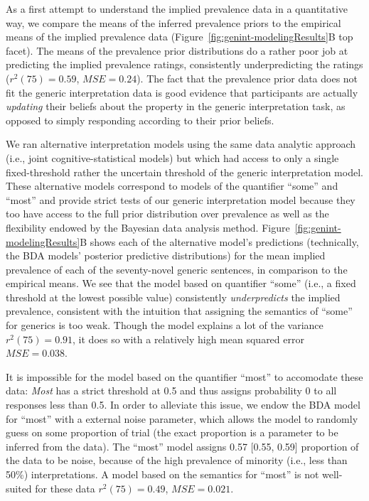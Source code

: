 \documentclass[floatsintext,doc]{apa6}
\theoremstyle{definition}
\theoremstyle{definition}
\theoremstyle{definition}
\theoremstyle{remark}
\begin{document}

As a first attempt to understand the implied prevalence data in a
quantitative way, we compare the means of the inferred prevalence priors
to the empirical means of the implied prevalence data
(Figure~\ref{fig:genint-modelingResults}B top facet). The means of the
prevalence prior distributions do a rather poor job at predicting the
implied prevalence ratings, consistently underpredicting the ratings
(\(r^2(75) = 0.59\), \(MSE = 0.24\)). The fact that the prevalence prior
data does not fit the generic interpretation data is good evidence that
participants are actually \emph{updating} their beliefs about the
property in the generic interpretation task, as opposed to simply
responding according to their prior beliefs.

We ran alternative interpretation models using the same data analytic
approach (i.e., joint cognitive-statistical models) but which had access
to only a single fixed-threshold rather the uncertain threshold of the
generic interpretation model.
 These alternative models correspond to
models of the quantifier \enquote{some} and \enquote{most} and provide
strict tests of our generic interpretation model because they too have
access to the full prior distribution over prevalence as well as the
flexibility endowed by the Bayesian data analysis method.
Figure~\ref{fig:genint-modelingResults}B shows each of the alternative
model's predictions (technically, the BDA models' posterior predictive
distributions) for the mean implied prevalence of each of the
seventy-novel generic sentences, in comparison to the empirical means.
We see that the model based on quantifier \enquote{some} (i.e., a fixed
threshold at the lowest possible value) consistently
\emph{underpredicts} the implied prevalence, consistent with the
intuition that assigning the semantics of \enquote{some} for generics is
too weak. Though the model explains a lot of the variance
\(r^2(75) = 0.91\), it does so with a relatively high mean squared error
\(MSE = 0.038\).

It is impossible for the model based on the quantifier \enquote{most} to
accomodate these data: \emph{Most} has a strict threshold at 0.5 and
thus assigns probability 0 to all responses less than 0.5.  In order to
alleviate this issue, we endow the BDA model for \enquote{most} with a
external noise parameter, which allows the model to randomly guess on
some proportion of trial (the exact proportion is a parameter to be
inferred from the data). The \enquote{most} model assigns 0.57 {[}0.55,
0.59{]} proportion of the data to be noise, because of the high
prevalence of minority (i.e., less than 50\%) interpretations. A model
based on the semantics for \enquote{most} is not well-suited for these
data \(r^2(75) = 0.49\), \(MSE = 0.021\).
\end{document}
